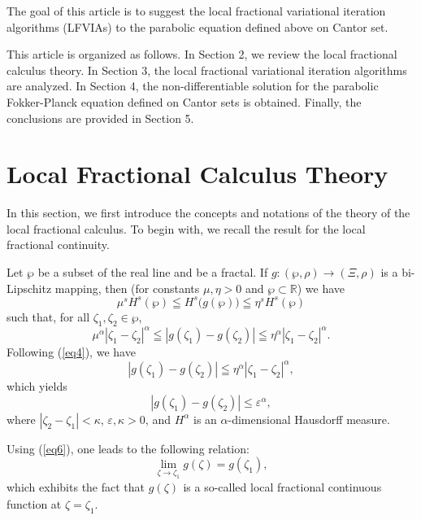 \documentclass[10pt]{NSP1}
\begin{document}
The goal of this article is to suggest the local fractional variational
iteration algorithms (LFVIAs) \cite {39,40} to the parabolic equation defined
above on Cantor set.

This article is organized as follows.
In Section 2, we review the local fractional calculus theory. In Section 3,
the local fractional variational iteration algorithms are analyzed. In
Section 4, the non-differentiable solution for the parabolic Fokker-Planck
equation defined on Cantor sets is obtained. Finally, the conclusions are
provided in Section 5.

\section{\; Local Fractional Calculus Theory}
In this section, we first introduce the concepts and notations of the theory
of the local fractional calculus. To begin with, we recall the result for
the local fractional continuity.

Let $\wp$ be a subset of the real line and be a fractal. If $g:\left( {\wp
,\rho } \right)\to \left( {\Xi ,\rho } \right)$ is a bi-Lipschitz mapping,
then (for constants $\mu ,\eta >0$ and $\wp \subset \mathbb{R} $) we have
\begin{equation}
\label{eq3}
\mu ^sH^s\left( \wp \right)\leqq H^s\big( {g\left( \wp \right)}\big)\leqq
\eta ^sH^s\left( \wp \right)
\end{equation}
such that, for all $\zeta _1 ,\zeta _2 \in \wp $,
\begin{equation}
\label{eq4}
\mu ^\alpha \left| {\zeta _1 -\zeta _2 } \right|^\alpha \leqq \left| {g\left(
{\zeta _1 } \right)-g\left( {\zeta _2 } \right)} \right|\leqq \eta ^\alpha
\left| {\zeta _1 -\zeta _2 } \right|^\alpha .
\end{equation}
Following (\ref{eq4}), we have
\begin{equation}
\label{eq5}
\left| {g\left( {\zeta _1 } \right)-g\left( {\zeta _2 } \right)} \right|\leqq
\eta ^\alpha \left| {\zeta _1 -\zeta _2 } \right|^\alpha,
\end{equation}
which yields
\begin{equation}
\label{eq6}
\left| {g\left( {\zeta _1 } \right)-g\left( {\zeta _2 } \right)} \right|\le
\varepsilon ^\alpha,
\end{equation}
where $\left| {\zeta _2 -\zeta _1 } \right|<\kappa $, $\varepsilon ,\kappa
>0$, and $H^\alpha _{ }$ is an $\alpha$-dimensional Hausdorff measure.

Using (\ref{eq6}), one leads to the following relation:
\begin{equation}
\label{eq7}
\mathop {\lim }\limits_{\zeta \to \zeta _1 } g\left( \zeta \right)=g\left(
{\zeta _1 } \right),
\end{equation}
which exhibits the fact that $g\left( \zeta \right)_{ }$ is a so-called local
fractional continuous function at $\zeta =\zeta _1 $.
\end{document}
